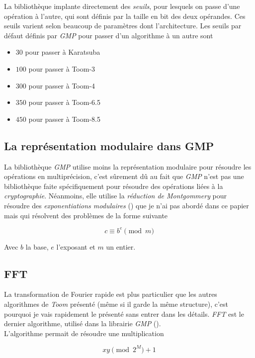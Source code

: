 \documentclass[letterpaper]{article}
\begin{document}
La bibliothèque implante directement des \emph{seuils}, pour lesquels
on passe d'une opération à l'autre, qui sont définis par la taille en bit des
deux opérandes. Ces seuils varient selon beaucoup de paramètres dont
l'architecture. Les seuils par défaut définis par \emph{GMP} pour passer d'un
algorithme à un autre sont

\begin{itemize}
  \item $30$ pour passer à Karatsuba
  \item $100$ pour passer à Toom-3
  \item $300$ pour passer à Toom-4
  \item $350$ pour passer à Toom-6.5
  \item $450$ pour passer à Toom-8.5
\end{itemize}

\subsection{La représentation modulaire dans GMP}

La bibliothèque \emph{GMP} utilise moins la représentation modulaire pour résoudre les
opérations en multiprécision, c'est sûrement dû au fait que \emph{GMP} n'est pas
une bibliothèque faite spécifiquement pour résoudre des opérations liées à la
\emph{cryptographie}. Néanmoins, elle utilise la \emph{réduction de Montgommery}
pour résoudre des \emph{exponentiations modulaires} (\cite{gmplibmodularpowering}) que
je n'ai pas abordé dans ce papier mais qui résolvent des problèmes de la forme
suivante

$$c \equiv b^{e} \pmod {m}$$

Avec $b$ la base, $e$ l'exposant et $m$ un entier.

\subsection{FFT}

La transformation de Fourier rapide est plus particulier que les autres
algorithmes de \emph{Toom} présenté (même si il garde la même structure),
c'est pourquoi je vais rapidement le présenté sans entrer dans les détails.
\emph{FFT} est le dernier algorithme, utilisé dans la librairie \emph{GMP}
(\cite{gmplibfft}).\\

L'algorithme permait de résoudre une multiplication

$$xy \pmod 2^{M} + 1$$
\end{document}
